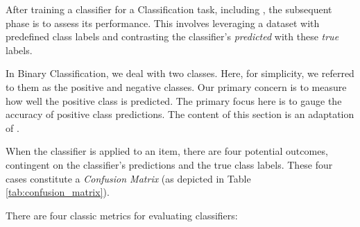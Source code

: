 \label{02_evaluation_metrics}

After training a classifier for a Classification task, including \textclassification{}, the subsequent phase is to assess its performance. 
This involves leveraging a dataset with predefined class labels and contrasting the classifier's \emph{predicted} with these \emph{true} labels.

In Binary Classification, we deal with two classes. Here, for simplicity, we  referred to them as the positive and negative classes. 
Our primary concern is to measure how well the positive class is predicted.
The primary focus here is to gauge the accuracy of positive class predictions. The content of this section is an adaptation of .


When the classifier is applied to an item, there are four potential outcomes, contingent on the classifier's predictions and the true class labels. These four cases constitute a \emph{Confusion Matrix} (as depicted in Table \ref{tab:confusion_matrix}).





\begin{table}[ht]
\centering
{}
\caption{Classification Outcomes}
\label{tab:02_classification_outcomes}
\end{table}



There are four classic metrics for evaluating classifiers:

